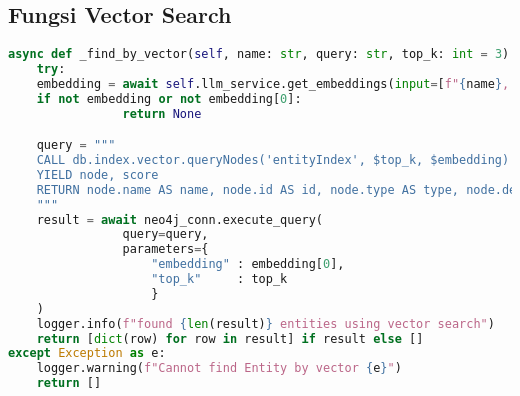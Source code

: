 \subsection{Fungsi Vector Search}
\begin{lstlisting}[numbers=none, language=python]
async def _find_by_vector(self, name: str, query: str, top_k: int = 3) -> list[dict]:
	try: 
    embedding = await self.llm_service.get_embeddings(input=[f"{name}, {query}"], task="RETRIEVAL_QUERY")
    if not embedding or not embedding[0]:
				return None

    query = """
    CALL db.index.vector.queryNodes('entityIndex', $top_k, $embedding)
    YIELD node, score
    RETURN node.name AS name, node.id AS id, node.type AS type, node.description AS description, score
    """
    result = await neo4j_conn.execute_query(
				query=query,
				parameters={
    				"embedding" : embedding[0],
    				"top_k"     : top_k
    				}
    )
    logger.info(f"found {len(result)} entities using vector search")
    return [dict(row) for row in result] if result else []
except Exception as e:
    logger.warning(f"Cannot find Entity by vector {e}")
    return []
\end{lstlisting}
